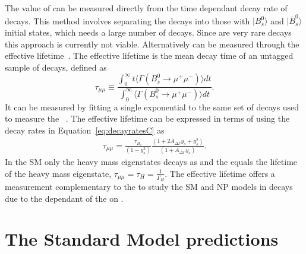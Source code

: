 The value of \ADG can be measured directly from the time dependant decay rate of \bsmumu decays. This method involves separating the \bsmumu decays into those with $| B^0_s \rangle$ and $|\overline{B}^0_s\rangle$ initial states, which needs a large number of \bsmumu decays. Since \bsmumu are very rare decays this approach is currently not viable. Alternatively \ADG can be measured through the \bsmumu effective lifetime~\cite{DeBruyn:2012wj}. The effective lifetime is the mean decay time of an untagged sample of \bsmumu decays, defined as~\cite{Fleischer:2011cw}
\begin{equation}
  \tau_{\mu\mu} \equiv \frac{\int^{\infty}_0 t\langle \Gamma (B^0_s \to \mu^+ \mu^-) \rangle dt}{\int^{\infty}_0 \langle \Gamma (B^0_s \to\mu^+ \mu^-) \rangle dt}.
\label{eq:EL_def}
\end{equation}
It can be measured by fitting a single exponential to the same set of decays used to measure the \BF~\cite{DeBruyn:2012wj}. The effective lifetime can be expressed in terms of \ADG using the decay rates in Equation~\ref{eq:decayratesC} as
\begin{align}
\tau_{\mu\mu} %
= \frac{\tau_{B_{s}}}{(1 - y_{s}^{2})} \frac{( 1 + 2A_{\Delta\Gamma}y_{s} + y_{s}^{2})}{(1 + A_{\Delta\Gamma}y_{s})}.
\end{align}
In the SM only the heavy \bs mass eigenstates decays as \bsmumu and the \el equals the lifetime of the heavy mass eigenstate, $\tau_{\mu\mu} = \tau_H = \frac{1}{\Gamma_H}$. The effective lifetime offers a measurement complementary to the \BFs to study the SM and NP models in \bsmumu decays due to the dependant of the \el on \ADG.

\section{The Standard Model predictions}
\label{sec:SM_predictions}

